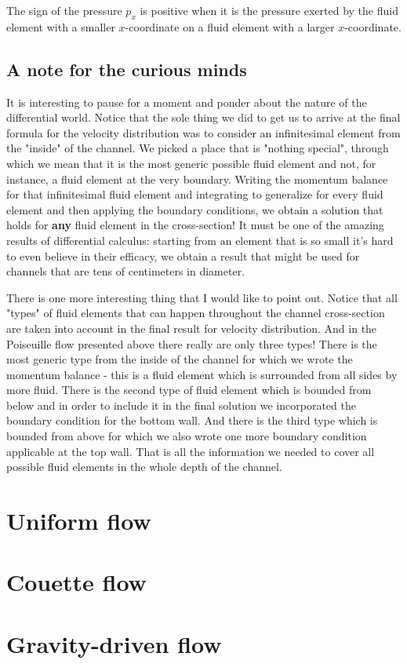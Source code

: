 \documentclass[10pt]{article}
\begin{document}
The sign of the pressure $p_x$ is positive when it is the pressure exerted by the fluid element with a smaller $x$-coordinate on a fluid element with a larger  $x$-coordinate.




\subsection{A note for the curious minds}

It is interesting to pause for a moment and ponder about the nature of the differential world. Notice that the sole thing we did to get us to arrive at the final formula for the velocity distribution was to consider an infinitesimal element from the "inside" of the channel. We picked a place that is "nothing special", through which we mean that it is the most generic possible fluid element and not, for instance, a fluid element at the very boundary. Writing the momentum balance for that infinitesimal fluid element and integrating to generalize for every fluid element and then applying the boundary conditions, we obtain a solution that holds for \textbf{any} fluid element in the cross-section! It must be one of the amazing results of differential calculus: starting from an element that is so small it's hard to even believe in their efficacy, we obtain a result that might be used for channels that are tens of centimeters in diameter.

There is one more interesting thing that I would like to point out. Notice that all "types" of fluid elements that can happen throughout the channel cross-section are taken into account in the final result for velocity distribution. And in the Poiseuille flow presented above there really are only three types! There is the most generic type from the inside of the channel for which we wrote the momentum balance - this is a fluid element which is surrounded from all sides by more fluid. There is the second type of fluid element which is bounded from below and in order to include it in the final solution we incorporated the boundary condition for the bottom wall. And there is the third type which is bounded from above for which we also wrote one more boundary condition applicable at the top wall. That is all the information we needed to cover all possible fluid elements in the whole depth of the channel.



\section{Uniform flow}




\section{Couette flow}



\section{Gravity-driven flow}


\begin{thebibliography}{3}

\item 

\end{thebibliography}
\end{document}
